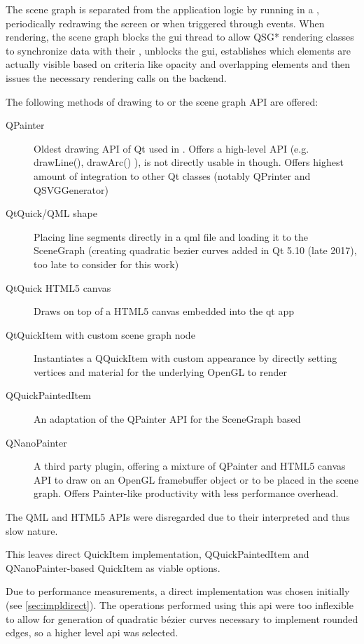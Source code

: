 The scene graph is separated from the application logic by running in a , periodically redrawing the screen or when triggered through events. When rendering, the scene graph blocks the \gls{gui} thread to allow {QSG*} rendering classes to synchronize data with their , unblocks the \gls{gui}, establishes which elements are actually visible based on criteria like opacity and overlapping elements and then issues the necessary rendering calls on the backend.

The following methods of drawing to  or the scene graph API are offered:
\begin{description}
	\item [QPainter] Oldest drawing API of Qt used in . Offers a high-level API (e.g. drawLine(), drawArc() ), is not directly usable in  though. Offers highest amount of integration to other Qt classes (notably QPrinter and QSVGGenerator)
	\item [QtQuick/QML shape] Placing line segments directly in a \gls{qml} file and loading it to the SceneGraph (creating quadratic bezier curves added in Qt 5.10 (late 2017), too late to consider for this work)
	\item [QtQuick HTML5 canvas] Draws on top of a HTML5 canvas embedded into the qt app
	\item [QtQuickItem with custom scene graph node] Instantiates a QQuickItem with custom appearance by directly setting vertices and material for the underlying OpenGL to render
	\item [QQuickPaintedItem] An adaptation of the QPainter API for the SceneGraph based  
	\item [QNanoPainter] A third party plugin, offering a mixture of QPainter and HTML5 canvas API to draw on an OpenGL framebuffer object or  to be placed in the  scene graph. Offers Painter-like productivity with less performance overhead.
\end{description}

The QML and HTML5 APIs were disregarded due to their interpreted and thus slow nature.

This leaves direct QuickItem implementation, QQuickPaintedItem and QNanoPainter-based QuickItem as viable options.

Due to performance measurements, a direct implementation was chosen initially (see \ref{sec:impldirect}). The operations performed using this \gls{api} were too inflexible to allow for generation of quadratic bézier curves necessary to implement rounded edges, so a higher level \gls{api} was selected.

